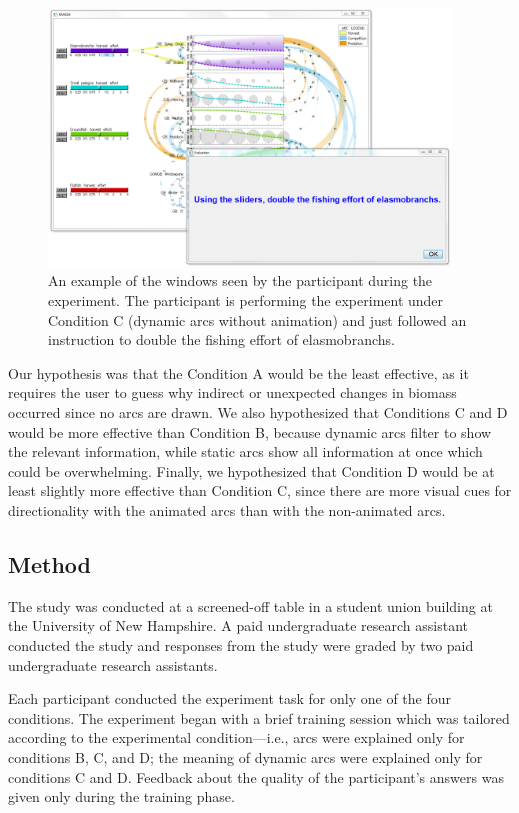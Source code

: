 \begin{figure}[h]
	\centering
	\includegraphics[width=0.95\textwidth]{figures/png/experiment.png}
	\caption[An example of the windows seen by the participant during the experiment.]{An example of the windows seen by the participant during the experiment.  The participant is performing the experiment under Condition C (dynamic arcs without animation) and just followed an instruction to double the fishing effort of elasmobranchs.}
	\label{fig:experiment}
\end{figure}

Our hypothesis was that the Condition A would be the least effective, as it requires the user to guess why indirect or unexpected changes in biomass occurred since no arcs are drawn.  We also hypothesized that Conditions C and D would be more effective than Condition B, because dynamic arcs filter to show the relevant information, while static arcs show all information at once which could be overwhelming.  Finally, we hypothesized that Condition D would be at least slightly more effective than Condition C, since there are more visual cues for directionality with the animated arcs than with the non-animated arcs.

\subsection{Method}

The study was conducted at a screened-off table in a student union building at the University of New Hampshire.  A paid undergraduate research assistant conducted the study and responses from the study were graded by two paid undergraduate research assistants.

Each participant conducted the experiment task for only one of the four conditions.  The experiment began with a brief training session which was tailored according to the experimental condition---i.e., arcs were explained only for conditions B, C, and D; the meaning of dynamic arcs were explained only for conditions C and D.  Feedback about the quality of the participant's answers was given only during the training phase.  

